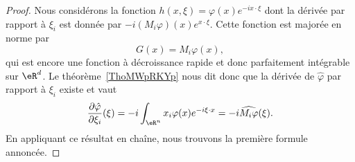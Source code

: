 \begin{proof}
    Nous considérons la fonction \( h(x,\xi)=\varphi(x) e^{-ix\cdot \xi}\) dont la dérivée par rapport à \( \xi_i\) est donnée par \( -i(M_{i}\varphi)(x) e^{x\cdot \xi}\). Cette fonction est majorée en norme par
    \begin{equation}
        G(x)=M_i\varphi(x),
    \end{equation}
    qui est encore une fonction à décroissance rapide et donc parfaitement intégrable sur \( \eR^d\). Le théorème~\ref{ThoMWpRKYp} nous dit donc que la dérivée de \( \hat \varphi\) par rapport à \( \xi_i\) existe et vaut
    \begin{equation}
        \frac{ \partial \hat\varphi }{ \partial \xi_i }(\xi)=-i\int_{\eR^n}x_i\varphi(x) e^{-i\xi\cdot x}=-i\widehat{M_i\varphi}(\xi).
    \end{equation}
    En appliquant ce résultat en chaîne, nous trouvons la première formule annoncée.


\end{proof}
